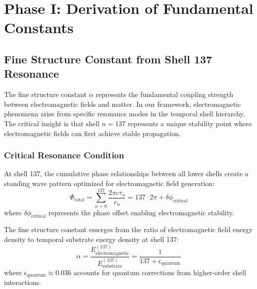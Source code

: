 \documentclass[12pt,a4paper]{article}
\begin{document}
\section{Phase I: Derivation of Fundamental Constants}

\subsection{Fine Structure Constant from Shell 137 Resonance}

The fine structure constant $\alpha$ represents the fundamental coupling strength between electromagnetic fields and matter. In our framework, electromagnetic phenomena arise from specific resonance modes in the temporal shell hierarchy. The critical insight is that shell $n=137$ represents a unique stability point where electromagnetic fields can first achieve stable propagation.

\subsubsection{Critical Resonance Condition}

At shell 137, the cumulative phase relationships between all lower shells create a standing wave pattern optimized for electromagnetic field generation:
\begin{equation}
\Phi_{\text{total}} = \sum_{n=0}^{137} \frac{2\pi c \tau_n}{r_n} = 137 \cdot 2\pi + \delta\phi_{\text{critical}}
\end{equation}
where $\delta\phi_{\text{critical}}$ represents the phase offset enabling electromagnetic stability.

\begin{theorem}
The fine structure constant emerges from the ratio of electromagnetic field energy density to temporal substrate energy density at shell 137:
\begin{equation}
\alpha = \frac{E_{\text{electromagnetic}}^{(137)}}{E_{\text{substrate}}^{(137)}} = \frac{1}{137 + \epsilon_{\text{quantum}}}
\end{equation}
where $\epsilon_{\text{quantum}} \approx 0.036$ accounts for quantum corrections from higher-order shell interactions.
\end{theorem}
\end{document}
